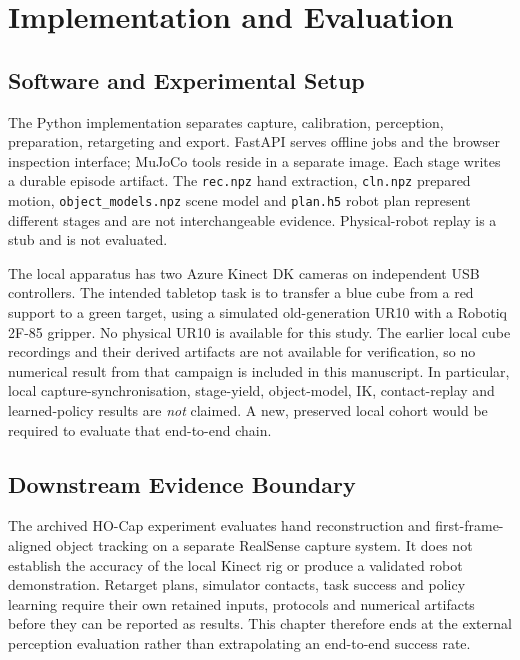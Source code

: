 \chapter{Implementation and Evaluation}
\label{ch:impl}

\section{Software and Experimental Setup}
\label{sec:arch}

The Python implementation separates capture, calibration, perception,
preparation, retargeting and export. FastAPI serves offline jobs and the
browser inspection interface; MuJoCo tools reside in a separate image.
Each stage writes a durable episode artifact. The \texttt{rec.npz} hand
extraction, \texttt{cln.npz} prepared motion,
\texttt{object\_models.npz} scene model and \texttt{plan.h5} robot plan
represent different stages and are not interchangeable evidence.
Physical-robot replay is a stub and is not evaluated.

The local apparatus has two Azure Kinect DK cameras on independent USB
controllers. The intended tabletop task is to transfer a blue cube from
a red support to a green target, using a simulated old-generation UR10
with a Robotiq 2F-85 gripper. No physical UR10 is available for this
study. The earlier local cube recordings and their derived artifacts
are not available for verification, so no numerical result from that
campaign is included in this manuscript. In particular, local
capture-synchronisation, stage-yield, object-model, IK, contact-replay
and learned-policy results are \emph{not} claimed. A new, preserved
local cohort would be required to evaluate that end-to-end chain.



\section{Downstream Evidence Boundary}
\label{sec:downstream-boundary}

The archived HO-Cap experiment evaluates hand reconstruction and
first-frame-aligned object tracking on a separate RealSense capture
system. It does not establish the accuracy of the local Kinect rig or
produce a validated robot demonstration. Retarget plans, simulator
contacts, task success and policy learning require their own retained
inputs, protocols and numerical artifacts before they can be reported
as results. This chapter therefore ends at the external perception
evaluation rather than extrapolating an end-to-end success rate.
